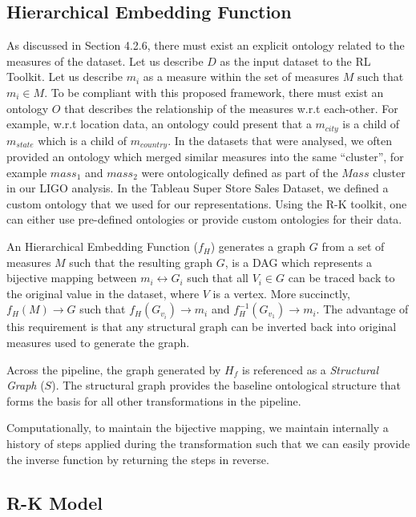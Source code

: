 \subsection{Hierarchical Embedding Function}
\label{sec:HEF}

As discussed in Section 4.2.6, there must exist an explicit ontology related to the measures of the dataset.  Let us describe $D$ as the input dataset to the RL Toolkit. Let us describe $m_{i}$ as a measure within the set of measures $M$ such that $m_{i} \in M$. To be compliant with this proposed framework, there must exist an ontology $O$ that describes the relationship of the measures w.r.t each-other. For example, w.r.t location data, an ontology could present that a \textbf{$m_{city}$} is a child of  \textbf{$m_{state}$} which is a child of \textbf{$m_{country}$}. In the datasets that were analysed, we often provided an ontology which merged similar measures into the same ``cluster'', for example $mass_{1}$ and $mass_{2}$ were ontologically defined as part of the $Mass$ cluster in our LIGO analysis. In the Tableau Super Store Sales Dataset, we defined a custom ontology that we used for our representations. Using the R-K toolkit, one can either use pre-defined ontologies or provide custom ontologies for their data.

An Hierarchical Embedding Function ($f_{H}$) generates a graph $G$ from a set of measures $M$ such that the resulting graph $G$, is a DAG which represents a bijective mapping between $m_{i} \longleftrightarrow G_{i}$ such that all $V_{i} \in G$ can be traced back to the original value in the dataset, where $V$ is a vertex. More succinctly, $f_{H}(M) \rightarrow G$ such that $f_{H}(G_{v_{i}}) \rightarrow m_{i}$ and $f^{-1}_{H}(G_{v_{1}}) \rightarrow m_{i}$. The advantage of this requirement is that any structural graph can be inverted back into original measures used to generate the graph.

Across the pipeline, the graph generated by $H_{f}$ is referenced as a \textit{Structural Graph} ($S$). The structural graph provides the baseline ontological structure that forms the basis for all other transformations in the pipeline.

Computationally, to maintain the bijective mapping, we maintain internally a history of steps applied during the transformation such that we can easily provide the inverse function by returning the steps in reverse.

\subsection{R-K Model}

